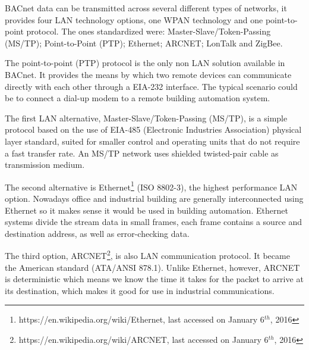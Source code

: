 %

BACnet data can be transmitted across several different types of networks, it provides four LAN technology options, one WPAN technology and one point-to-point protocol. The ones standardized were:  Master-Slave/Token-Passing (MS/TP); Point-to-Point (PTP); Ethernet; ARCNET; LonTalk and ZigBee.

The point-to-point (PTP) protocol is the only non LAN solution available in BACnet. It provides the means by which two remote devices can communicate directly with each other through a EIA-232 interface. The typical scenario could be to connect a dial-up modem to a remote building automation system. 

The first LAN alternative, Master-Slave/Token-Passing (MS/TP), is a simple protocol based on the use of EIA-485 (Electronic Industries Association) physical layer standard, suited for smaller control and operating units that do not require a fast transfer rate. An MS/TP network uses shielded twisted-pair cable as transmission medium.

The second alternative is Ethernet\footnote{https://en.wikipedia.org/wiki/Ethernet, last accessed on January 6$^{th}$, 2016} (ISO 8802-3), the highest performance LAN option. Nowadays office and industrial building are generally interconnected using Ethernet so it makes sense it would be used in building automation. Ethernet systems divide the stream data in small frames, each frame contains a source and destination address, as well as error-checking data.

The third option, ARCNET\footnote{https://en.wikipedia.org/wiki/ARCNET, last accessed on January 6$^{th}$, 2016}, is also LAN communication protocol. It became the American standard (ATA/ANSI 878.1). Unlike Ethernet, however, ARCNET is deterministic which means we know  the time it takes for the packet to arrive at its destination, which makes it good for use in industrial communications.

